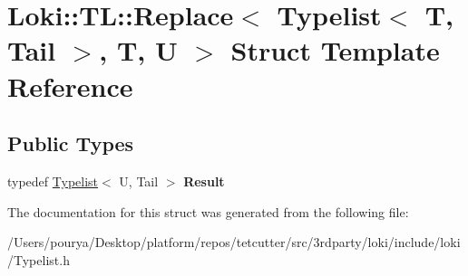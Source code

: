 \hypertarget{structLoki_1_1TL_1_1Replace_3_01Typelist_3_01T_00_01Tail_01_4_00_01T_00_01U_01_4}{}\section{Loki\+:\+:T\+L\+:\+:Replace$<$ Typelist$<$ T, Tail $>$, T, U $>$ Struct Template Reference}
\label{structLoki_1_1TL_1_1Replace_3_01Typelist_3_01T_00_01Tail_01_4_00_01T_00_01U_01_4}
\subsection*{Public Types}
\begin{DoxyCompactItemize}
\item 
\hypertarget{structLoki_1_1TL_1_1Replace_3_01Typelist_3_01T_00_01Tail_01_4_00_01T_00_01U_01_4_af9fce1f87c2248f35a12c0a6c470632d}{}typedef \hyperlink{structLoki_1_1Typelist}{Typelist}$<$ U, Tail $>$ {\bfseries Result}\label{structLoki_1_1TL_1_1Replace_3_01Typelist_3_01T_00_01Tail_01_4_00_01T_00_01U_01_4_af9fce1f87c2248f35a12c0a6c470632d}

\end{DoxyCompactItemize}


The documentation for this struct was generated from the following file\+:\begin{DoxyCompactItemize}
\item 
/\+Users/pourya/\+Desktop/platform/repos/tetcutter/src/3rdparty/loki/include/loki/Typelist.\+h\end{DoxyCompactItemize}
